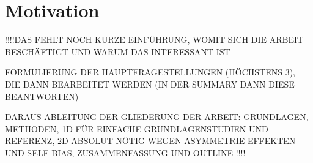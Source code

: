%
	\chapter*{Motivation}
%
!!!!DAS FEHLT NOCH
KURZE EINFÜHRUNG, WOMIT SICH DIE ARBEIT BESCHÄFTIGT UND WARUM DAS INTERESSANT IST

FORMULIERUNG DER HAUPTFRAGESTELLUNGEN (HÖCHSTENS 3), DIE DANN BEARBEITET WERDEN (IN DER SUMMARY DANN DIESE BEANTWORTEN)

DARAUS ABLEITUNG DER GLIEDERUNG DER ARBEIT: GRUNDLAGEN, METHODEN, 1D FÜR EINFACHE GRUNDLAGENSTUDIEN UND REFERENZ, 2D ABSOLUT NÖTIG WEGEN ASYMMETRIE-EFFEKTEN UND SELF-BIAS,
ZUSAMMENFASSUNG UND OUTLINE
!!!!
